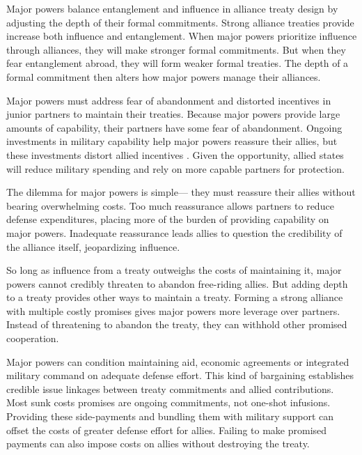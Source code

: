 \documentclass[12pt]{article}
\begin{document}
Major powers balance entanglement and influence in alliance treaty design by adjusting the depth of their formal commitments. 
Strong alliance treaties provide increase both influence and entanglement. 
When major powers prioritize influence through alliances, they will make stronger formal commitments.
But when they fear entanglement abroad, they will form weaker formal treaties. 
The depth of a formal commitment then alters how major powers manage their alliances. 


Major powers must address fear of abandonment and distorted incentives in junior partners to maintain their treaties. 
Because major powers provide large amounts of capability, their partners have some fear of abandonment. 
Ongoing investments in military capability help major powers reassure their allies, but these investments distort allied incentives \citep{Lake1996, Lake2009}. 
Given the opportunity, allied states will reduce military spending and rely on more capable partners for protection.


The dilemma for major powers is simple--- they must reassure their allies without bearing overwhelming costs.
Too much reassurance allows partners to reduce defense expenditures, placing more of the burden of providing capability on major powers. 
Inadequate reassurance leads allies to question the credibility of the alliance itself, jeopardizing influence.   


So long as influence from a treaty outweighs the costs of maintaining it, major powers cannot credibly threaten to abandon free-riding allies. 
But adding depth to a treaty provides other ways to maintain a treaty.
Forming a strong alliance with multiple costly promises gives major powers more leverage over partners. 
Instead of threatening to abandon the treaty, they can withhold other promised cooperation. 


Major powers can condition maintaining aid, economic agreements or integrated military command on adequate defense effort.
This kind of bargaining establishes credible issue linkages between treaty commitments and allied contributions. 
Most sunk costs promises are ongoing commitments, not one-shot infusions. 
Providing these side-payments and bundling them with military support can offset the costs of greater defense effort for allies. 
Failing to make promised payments can also impose costs on allies without destroying the treaty. 
\end{document}
